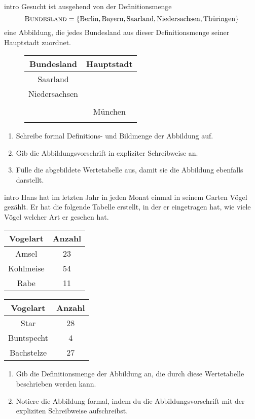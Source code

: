 \documentclass[../abbildungen.tex]{subfiles}
\begin{document}
\begin{exercise}{intro}
    Gesucht ist ausgehend von der Definitionsmenge \[\textsc{Bundesland}=\{\text{Berlin},\text{Bayern},\text{Saarland},\text{Niedersachsen},\text{Thüringen}\}\] eine Abbildung, die jedes Bundesland aus dieser Definitionsmenge seiner Hauptstadt zuordnet.
    \begin{wrapfigure}{r}{.4\textwidth}
        \centering
        \begin{tabular}{cc}\toprule
            Bundesland & Hauptstadt\\\midrule
            Saarland & \\
            Niedersachsen & \\
             & \\
             & München\\
             & \\\bottomrule
        \end{tabular}
    \end{wrapfigure}
    \begin{enumerate}
        \item Schreibe formal Definitions- und Bildmenge der Abbildung auf.
        \item Gib die Abbildungsvorschrift in expliziter Schreibweise an.
        \item Fülle die abgebildete Wertetabelle aus, damit sie die Abbildung ebenfalls darstellt.
    \end{enumerate}
\end{exercise}
\begin{exercise}{intro}
    Hans hat im letzten Jahr in jeden Monat einmal in seinem Garten Vögel gezählt. Er hat die folgende Tabelle erstellt, in der er eingetragen hat, wie viele Vögel welcher Art er gesehen hat.
    \begin{center}
        \begin{tabular}{cc}\toprule
            Vogelart & Anzahl\\\midrule
            Amsel & 23\\
            Kohlmeise & 54\\
            Rabe & 11\\\bottomrule
        \end{tabular}
        \begin{tabular}{cc}\toprule
            Vogelart & Anzahl\\\midrule
            Star & 28\\
            Buntspecht & 4\\
            Bachstelze & 27\\\bottomrule
        \end{tabular}
    \end{center}
    \begin{enumerate}
        \item Gib die Definitionsmenge der Abbildung an, die durch diese Wertetabelle beschrieben werden kann.
        \item Notiere die Abbildung formal, indem du die Abbildungsvorschrift mit der expliziten Schreibweise aufschreibst.
    \end{enumerate}
\end{exercise}
\end{document}
